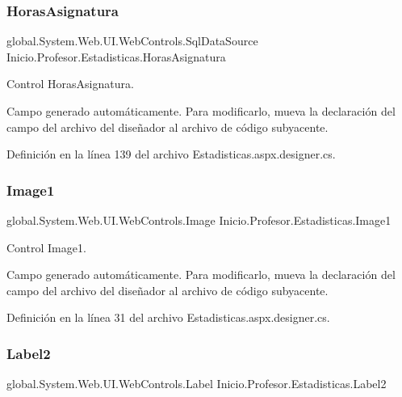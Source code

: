 \subsubsection{\texorpdfstring{HorasAsignatura}{HorasAsignatura}}
{\footnotesize\ttfamily global.\+System.\+Web.\+U\+I.\+Web\+Controls.\+Sql\+Data\+Source Inicio.\+Profesor.\+Estadisticas.\+Horas\+Asignatura\hspace{0.3cm}{\ttfamily [protected]}}



Control Horas\+Asignatura. 

Campo generado automáticamente. Para modificarlo, mueva la declaración del campo del archivo del diseñador al archivo de código subyacente. 

Definición en la línea 139 del archivo Estadisticas.\+aspx.\+designer.\+cs.

\mbox{\label{classInicio_1_1Profesor_1_1Estadisticas_a6193bfaaffbaa9eeec1a7e4e8387f077}} 
\subsubsection{\texorpdfstring{Image1}{Image1}}
{\footnotesize\ttfamily global.\+System.\+Web.\+U\+I.\+Web\+Controls.\+Image Inicio.\+Profesor.\+Estadisticas.\+Image1\hspace{0.3cm}{\ttfamily [protected]}}



Control Image1. 

Campo generado automáticamente. Para modificarlo, mueva la declaración del campo del archivo del diseñador al archivo de código subyacente. 

Definición en la línea 31 del archivo Estadisticas.\+aspx.\+designer.\+cs.

\mbox{\label{classInicio_1_1Profesor_1_1Estadisticas_a12c6327350b856ff25585c2b1f00dfe7}} 
\subsubsection{\texorpdfstring{Label2}{Label2}}
{\footnotesize\ttfamily global.\+System.\+Web.\+U\+I.\+Web\+Controls.\+Label Inicio.\+Profesor.\+Estadisticas.\+Label2\hspace{0.3cm}{\ttfamily [protected]}}



